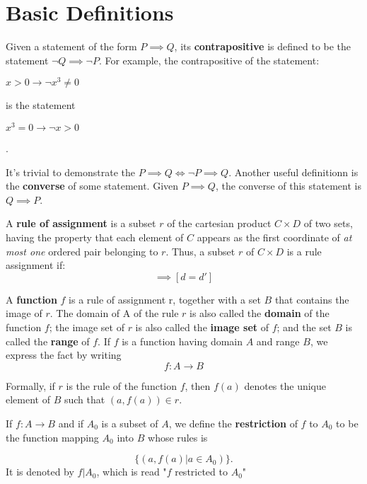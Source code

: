 \setcounter{section}{1}
\section*{Basic Definitions}

Given a statement of the form $P \implies Q$, its \textbf{contrapositive} is defined to be the statement $\neg Q \implies \neg P$. For example, the contrapositive of the statement:

\begin{center}
  $x > 0 \longrightarrow \neg x^3 \neq 0$
\end{center}

is the statement

\begin{center}
  $x^3 = 0 \longrightarrow \neg x > 0$
\end{center}.

It's trivial to demonstrate the $P \implies Q \iff \neg P \implies Q$. Another useful definitionn is the \textbf{converse} of some statement. Given $P \implies Q$, the converse of this statement is $Q \implies P$.

\begin{definition}[1]
  A \textbf{rule of assignment} is a subset $r$ of the cartesian product $C \times D$ of two sets, having the property that each element of $C$ appears as the first coordinate of \textit{at most one} ordered pair belonging to $r$. Thus, a subset $r$ of $C \times D$ is a rule assignment if: 
  \begin{equation}
     [(c, d) \in r \text{ and } (c,d') \in r] \implies [d = d']
  \end{equation}
\end{definition}

\begin{definition}
  A \textbf{function} $f$ is a rule of assignment r, together with a set $B$ that contains the image of $r$. The domain of A of the rule $r$ is also called the \textbf{domain} of the function $f$; the image set of $r$ is also called the \textbf{image set} of $f$; and the set $B$ is called the \textbf{range} of $f$. If $f$ is a function having domain $A$ and range $B$, we express the fact by writing
  \begin{displaymath}
    f: A \longrightarrow B
  \end{displaymath}
  
\end{definition}
Formally, if $r$ is the rule of the function $f$, then $f(a)$ denotes the unique element of $B$ such that $(a, f(a)) \in r$.
\begin{definition}
  If $f:A \to B$ and if $A_0$ is a subset of $A$, we define the \textbf{restriction} of $f$ to $A_0$ to be the function mapping $A_0$ into $B$ whose rules is

  \begin{equation}
    \{(a, f(a) | a \in A_0)\}.
    \label{eq:restriction function}
  \end{equation}
It is denoted by $f|A_0$, which is read "$f$ restricted to $A_0$" 
\end{definition}


